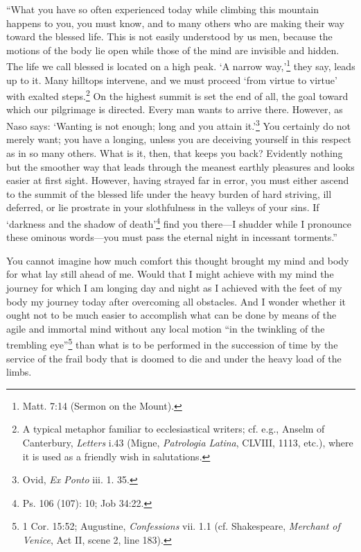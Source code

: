 ``What you have so often experienced today while climbing this
mountain happens to you, you must know, and to many others who are
making their way toward the blessed life. This  is not easily
understood by us men, because the motions of the body lie open while
those of the mind are invisible and hidden. The life we call blessed
is located on a high peak. `A narrow way,'\footnote{Matt. 7:14 (Sermon
on the Mount).} they say, leads up to it. Many hilltops intervene, and
we must proceed `from virtue to virtue' with exalted steps.\footnote{A
typical metaphor familiar to ecclesiastical writers; cf. e.g., Anselm
of Canterbury, \textit{Letters} i.43 (Migne, \textit{Patrologia
Latina}, CLVIII, 1113, etc.), where it is used as a friendly wish in
salutations.} On the highest summit is set the end of all, the goal
toward which our pilgrimage is directed. Every man wants to arrive
there. However, as Naso says: `Wanting is not enough; long and you
attain it.'\footnote{Ovid, \textit{Ex Ponto} iii. 1. 35.} You
certainly do not merely want; you have a longing, unless you are
deceiving yourself in this respect as in so many others. What is it,
then, that keeps you back? Evidently nothing but the smoother way that
leads through the meanest earthly pleasures and looks easier at first
sight. However, having strayed far in error, you must either ascend to
the summit of the blessed life under the heavy burden of hard
striving, ill deferred, or lie prostrate in your slothfulness in the
valleys of your sins. If `darkness and the shadow of
death'\footnote{Ps. 106 (107): 10; Job 34:22.} find you there---I
shudder while I pronounce these ominous words---you must pass the
eternal night in incessant torments.''

You cannot imagine how much comfort this thought brought my mind and
body for what lay still ahead of me. Would that I might achieve with
my mind the journey for which I am longing day and night as I achieved
with the feet of my body my journey today after overcoming all
obstacles. And I wonder whether it ought not to be much easier to
accomplish what can be done by means of the agile and immortal mind
without any local motion ``in the twinkling of the trembling
eye''\footnote{1 Cor. 15:52; Augustine, \textit{Confessions} vii. 1.1
(cf. Shakespeare, \textit{Merchant of Venice}, Act II, scene 2, line
183).} than what is to be performed in the succession of time by the
service  of the frail body that is doomed to die and under
the heavy load of the limbs.

